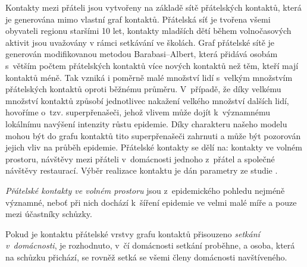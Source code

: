 



Kontakty mezi přáteli jsou vytvořeny na základě sítě přátelských kontaktů, která je generována mimo vlastní graf kontaktů. Přátelská síť je tvořena všemi obyvateli regionu staršími 10 let, kontakty mladších dětí během volnočasových aktivit jsou uvažovány v rámci setkávání ve školách. Graf přátelské sítě je generován modifikovanou metodou Barabasi--Albert, která přidává osobám s~větším počtem přátelských kontaktů více nových kontaktů než těm, kteří mají kontaktů méně. Tak vzniká i poměrně malé množství lidí s~velkým množstvím přátelských kontaktů oproti běžnému průměru. V~případě, že díky velkému množství kontaktů způsobí jednotlivec nakažení velkého množství dalších lidí, hovoříme o~tzv. superpřenašeči, jehož vlivem může dojít k~významnému lokálnímu navýšení intenzity růstu epidemie. Díky charakteru našeho modelu mohou být do grafu kontaktů tito superpřenašeči zahrnuti a může být pozorován jejich vliv na průběh epidemie.
Přátelské kontakty se dělí na: kontakty ve volném prostoru, návštěvy mezi přáteli v~domácnosti jednoho z~přátel a společné návštěvy restaurací. Výběr realizace kontaktu je dán parametry ze studie \cite{zaj:medianlife}.

\emph{Přátelské kontakty ve volném prostoru} jsou z~epidemického pohledu nejméně významné, neboť při nich dochází k~šíření epidemie ve velmi malé míře a pouze mezi účastníky schůzky.

Pokud je kontaktu přátelské vrstvy grafu kontaktů přisouzeno \emph{setkání v~do\-mác\-nos\-ti}, je rozhodnuto, v~čí domácnosti setkání proběhne, a osoba, která na schůzku přichází, se rovněž setká se všemi členy domácnosti navštíveného.

